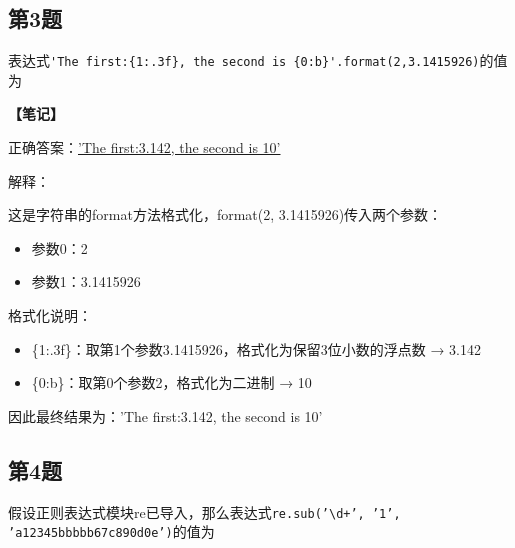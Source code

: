 \subsection{第3题}
表达式\verb|'The first:{1:.3f}, the second is {0:b}'.format(2,3.1415926)|的值为\\
\underline{\hspace{8cm}}

\begin{mdframed}[linewidth=1pt, linecolor=black]

  \textbf{\color{red}【笔记】}

  正确答案：\underline{'The first:3.142, the second is 10'}

  解释：

  \qquad 这是字符串的format方法格式化，format(2, 3.1415926)传入两个参数：
  \begin{itemize}
    \item 参数0：2
    \item 参数1：3.1415926
  \end{itemize}

  \qquad 格式化说明：
  \begin{itemize}
    \item \{1:.3f\}：取第1个参数3.1415926，格式化为保留3位小数的浮点数 → 3.142
    \item \{0:b\}：取第0个参数2，格式化为二进制 → 10
  \end{itemize}

  \qquad 因此最终结果为：'The first:3.142, the second is 10'

\end{mdframed}

\subsection{第4题}
假设正则表达式模块re已导入，那么表达式\texttt{re.sub('\textbackslash d+', '1', 'a12345bbbbb67c890d0e')}的值为\\
\underline{\hspace{8cm}}

